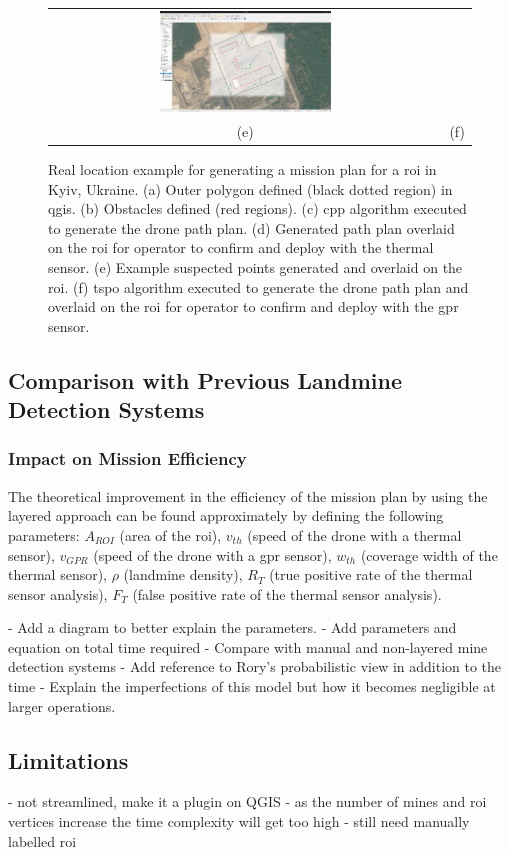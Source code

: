 \begin{figure}[h]
\begin{tabular}{cc}
        \includegraphics[width=0.45\textwidth]{figs/Jihwan/eg6.png} \\
        (e) & (f)
    \end{tabular}
    \caption[Real Location Example for Mission Planning]
    {Real location example for generating a mission plan for a \gls{roi} in Kyiv, Ukraine. (a) Outer polygon defined (black dotted region) in \gls{qgis}. (b) Obstacles defined (red regions). (c) \gls{cpp} algorithm executed to generate the drone path plan. (d) Generated path plan overlaid on the \gls{roi} for operator to confirm and deploy with the thermal sensor. (e) Example suspected points generated and overlaid on the \gls{roi}. (f) \gls{tspo} algorithm executed to generate the drone path plan and overlaid on the \gls{roi} for operator to confirm and deploy with the \gls{gpr} sensor. 
    }
    \label{fig:msp_example}
\end{figure}

\subsection{Comparison with Previous Landmine Detection Systems}
\label{sec:msp_comparison_manual_demining}

\subsubsection{Impact on Mission Efficiency}

The theoretical improvement in the efficiency of the mission plan by using the layered approach can be found approximately by defining the following parameters: $A_{ROI}$ (area of the \gls{roi}), $v_{th}$ (speed of the drone with a thermal sensor), $v_{GPR}$ (speed of the drone with a \gls{gpr} sensor), $w_{th}$ (coverage width of the thermal sensor), $\rho$ (landmine density), $R_T$ (true positive rate of the thermal sensor analysis), $F_T$ (false positive rate of the thermal sensor analysis). 

- Add a diagram to better explain the parameters. 
- Add parameters and equation on total time required
- Compare with manual and non-layered mine detection systems
- Add reference to Rory's probabilistic view in addition to the time
- Explain the imperfections of this model but how it becomes negligible at larger operations. 

\subsection{Limitations}
\label{sec:msp_limitations}

- not streamlined, make it a plugin on QGIS
- as the number of mines and roi vertices increase the time complexity will get too high
- still need manually labelled roi 